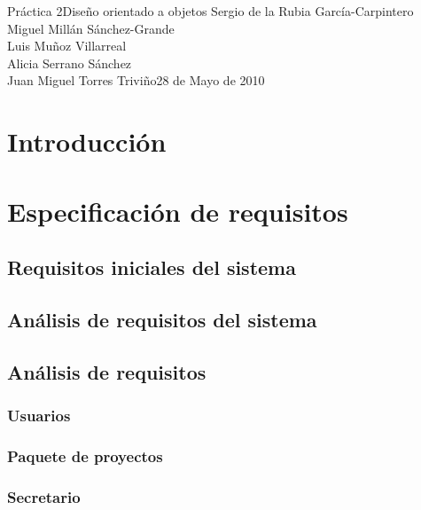 \documentclass[11pt,a4paper,spanish,twoside]{book}
\begin{document}


{Práctica 2}{Diseño orientado a objetos}
{Sergio de la Rubia García-Carpintero\\Miguel Millán Sánchez-Grande\\
  Luis Muñoz Villarreal\\Alicia Serrano Sánchez\\
  Juan Miguel Torres Triviño}{28 de Mayo de 2010}


\tableofcontents

\chapter*{Introducción}

\chapter{Especificación de requisitos}

\section{Requisitos iniciales del sistema}
\section{Análisis de requisitos del sistema}

\section{Análisis de requisitos}
\subsection{Usuarios}

\subsection{Paquete de proyectos}

\subsection{Secretario}
\end{document}
